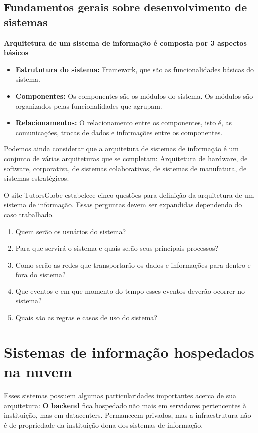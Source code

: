 \documentclass[12pt]{article}
\begin{document}
\subsection{Fundamentos gerais sobre desenvolvimento de sistemas}
\textbf{Arquitetura de um sistema de informação é composta por 3 aspectos básicos}
\begin{itemize}
    \item \textbf{Estrututura do sistema:} Framework, que são as funcionalidades básicas
    do sistema.
    \item \textbf{Componentes:} Os componentes são os módulos do sistema. Os
    módulos são organizados pelas funcionalidades que agrupam.
    \item \textbf{Relacionamentos:} O relacionamento entre os componentes, isto é,
    as comunicações, trocas de dados e informações entre os componentes.
\end{itemize}

Podemos ainda considerar que a arquitetura de sistemas de informação é um conjunto
de várias arquiteturas que se completam: Arquitetura de hardware, de software, corporativa,
de sistemas colaborativos, de sistemas de manufatura, de sistemas estratégicos.

O site TutorsGlobe estabelece cinco questões para definição da arquitetura de um
sistema de informação. Essas perguntas devem ser expandidas dependendo do caso trabalhado.

\begin{enumerate}[label=\textbf{\arabic*}.]
    \item Quem serão os usuários do sistema?
    \item Para que servirá o sistema e quais serão seus principais processos?
    \item Como serão as redes que transportarão os dados e informações para dentro
    e fora do sistema?
    \item Que eventos e em que momento do tempo esses eventos deverão ocorrer 
    no sistema?
    \item Quais são as regras e casos de uso do sistema?
\end{enumerate}

\indent
\section{Sistemas de informação hospedados na nuvem}
Esses sistemas possuem algumas particularidades importantes acerca de sua arquitetura:
\textbf{O backend} fica hospedado não mais em servidores pertencentes à instituição, 
mas em datacenters. Permanecem privados, mas a infraestrutura não é de propriedade 
da instituição dona dos sistemas de informação. 
\end{document}
